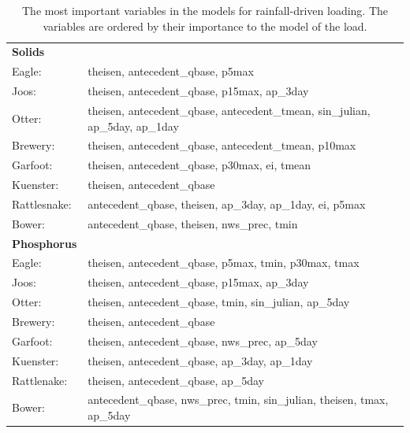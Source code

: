 \documentclass[10pt]{article}
\begin{document}
\begin{table}[h!]\small
    \begin{center}
    \begin{tabular}{ll}
        \textbf{Solids} & \\
        \hspace{5mm} Eagle: & theisen, antecedent\_qbase, p5max\\
        \hspace{5mm} Joos: & theisen, antecedent\_qbase, p15max, ap\_3day\\
        \hspace{5mm} Otter: & theisen, antecedent\_qbase, antecedent\_tmean, sin\_julian, ap\_5day, ap\_1day\\
        \hspace{5mm} Brewery: & theisen, antecedent\_qbase, antecedent\_tmean, p10max\\
        \hspace{5mm} Garfoot: & theisen, antecedent\_qbase, p30max, ei, tmean\\
        \hspace{5mm} Kuenster: & theisen, antecedent\_qbase\\
        \hspace{5mm} Rattlesnake: & antecedent\_qbase, theisen, ap\_3day, ap\_1day, ei, p5max \\
        \hspace{5mm} Bower: & antecedent\_qbase, theisen, nws\_prec, tmin
    \vspace{2mm}\\
        \textbf{Phosphorus} & \\
        \hspace{5mm} Eagle: & theisen, antecedent\_qbase, p5max, tmin, p30max, tmax\\
        \hspace{5mm} Joos: & theisen, antecedent\_qbase, p15max, ap\_3day\\
        \hspace{5mm} Otter: & theisen, antecedent\_qbase, tmin, sin\_julian, ap\_5day\\
        \hspace{5mm} Brewery: & theisen, antecedent\_qbase\\
        \hspace{5mm} Garfoot: & theisen, antecedent\_qbase, nws\_prec, ap\_5day\\
        \hspace{5mm} Kuenster: & theisen, antecedent\_qbase, ap\_3day, ap\_1day\\
        \hspace{5mm} Rattlenake: & theisen, antecedent\_qbase, ap\_5day\\
        \hspace{5mm} Bower: & antecedent\_qbase, nws\_prec, tmin, sin\_julian, theisen, tmax, ap\_5day\\
    \end{tabular}
    \caption{The most important variables in the models for rainfall-driven loading. The variables are ordered by their importance to the model of the load. \label{nosnow_predictor_list}}
    \end{center}
\end{table}
\end{document}
